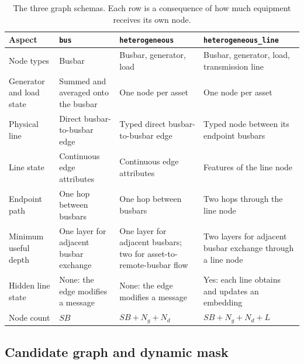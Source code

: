 \begin{table}[H]
  \centering
  \scriptsize
  \caption{The three graph schemas. Each row is a consequence of how much
  equipment receives its own node.}
  \label{tab:schema-comparison}
  \setlength{\tabcolsep}{4pt}
  \begin{tabular}{L{0.15\textwidth}L{0.24\textwidth}L{0.24\textwidth}L{0.25\textwidth}}
    \toprule
    Aspect & \texttt{bus} & \texttt{heterogeneous} & \texttt{heterogeneous\_line} \\
    \midrule
    Node types & Busbar & Busbar, generator, load & Busbar, generator, load, transmission line \\
    Generator and load state & Summed and averaged onto the busbar & One node per asset & One node per asset \\
    Physical line & Direct busbar-to-busbar edge & Typed direct busbar-to-busbar edge & Typed node between its endpoint busbars \\
    Line state & Continuous edge attributes & Continuous edge attributes & Features of the line node \\
    Endpoint path & One hop between busbars & One hop between busbars & Two hops through the line node \\
    Minimum useful depth & One layer for adjacent busbar exchange & One layer for adjacent busbars; two for asset-to-remote-busbar flow & Two layers for adjacent busbar exchange through a line node \\
    Hidden line state & None: the edge modifies a message & None: the edge modifies a message & Yes: each line obtains and updates an embedding \\
    Node count & $SB$ & $SB+N_g+N_d$ & $SB+N_g+N_d+L$ \\
    \bottomrule
  \end{tabular}
\end{table}

\subsection{Candidate graph and dynamic mask}
\label{subsec:graph-candidate-edges}

